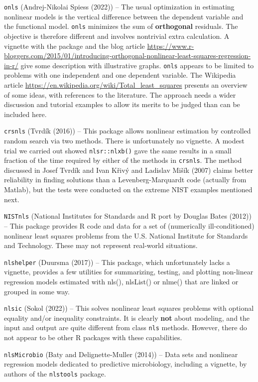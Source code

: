 \texttt{onls} (Andrej-Nikolai Spiess (2022)) -- The usual optimization in estimating nonlinear models
is the vertical difference between the dependent variable and the functional
model. \texttt{onls} minimizes the sum of \textbf{orthogonal} residuals. The objective is
therefore different and involves nontrivial extra calculation. A vignette with
the package and the blog article
\url{https://www.r-bloggers.com/2015/01/introducing-orthogonal-nonlinear-least-squares-regression-in-r/}
give some description with illustrative graphs. \texttt{onls} appears to be limited to
problems with one independent and one dependent variable. The Wikipedia article
\url{https://en.wikipedia.org/wiki/Total_least_squares} presents an overview of some
ideas, with references to the literature. The approach needs a wider
discussion and tutorial examples to allow its merits to be judged than can be
included here.

\texttt{crsnls} (Tvrdík (2016)) -- This package allows nonlinear estimation by
controlled random search via two methods. There is unfortunately no vignette.
A modest trial we carried out showed \texttt{nlsr::nlxb()} gave the same results in
a small fraction of the time required by either of the methods in \texttt{crsnls}. The
method discussed in Josef Tvrdík and Ivan Křivý and Ladislav Mišík (2007) claims better reliability in finding solutions
than a Levenberg-Marquardt code (actually from Matlab), but the tests were conducted
on the extreme NIST examples mentioned next.

\texttt{NISTnls} (National Institutes for Standards and R port by Douglas Bates (2012)) -- This package provides R code and data for a set of
(numerically ill-conditioned) nonlinear least squares problems from the U.S. National
Institute for Standards and Technology. These may not represent real-world situations.

\texttt{nlshelper} (Duursma (2017)) -- This package, which unfortunately lacks a
vignette, provides a few utilities for summarizing, testing, and plotting
non-linear regression models estimated with nls(), nlsList() or nlme() that
are linked or grouped in some way.

\texttt{nlsic} (Sokol (2022)) -- This solves nonlinear least squares problems with optional
equality and/or inequality constraints. It is clearly \textbf{not} about modeling, and
the input and output are quite different from class \texttt{nls} methods. However, there do
not appear to be other R packages with these capabilities.

\texttt{nlsMicrobio} (Baty and Delignette-Muller (2014)) -- Data sets and nonlinear regression models
dedicated to predictive microbiology, including a vignette, by authors of the
\texttt{nlstools} package.

